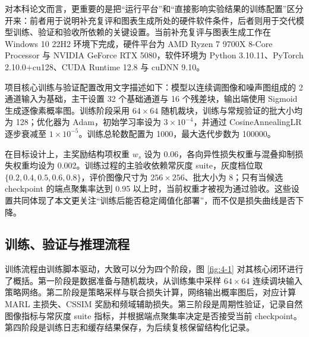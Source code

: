 \documentclass[thesis]{../zstucs-graduation-project}
\begin{document}
对本科论文而言，更重要的是把“运行平台”和“直接影响实验结果的训练配置”区分开来：前者用于说明补充复评和图表生成所处的硬件软件条件，后者则用于交代模型训练、验证和验收所依赖的关键设置。当前补充复评与图表生成工作在 Windows 10 22H2 环境下完成，硬件平台为 AMD Ryzen 7 9700X 8-Core Processor 与 NVIDIA GeForce RTX 5080，软件环境为 Python 3.10.11、PyTorch 2.10.0+cu128、CUDA Runtime 12.8 与 cuDNN 9.10。

项目核心训练与验证配置改用文字描述如下：模型以连续调图像和噪声图组成的 2 通道输入为基础，主干设置 32 个基础通道与 16 个残差块，输出端使用 Sigmoid 生成逐像素概率图。训练阶段采用 $64\times64$ 随机裁块，训练与常规验证的批大小均为 128；优化器为 Adam，初始学习率设为 $3\times10^{-4}$，并通过 CosineAnnealingLR 逐步衰减至 $1\times10^{-5}$。训练总轮数配置为 1000，最大迭代步数为 100000。

在目标设计上，主奖励结构项权重 $w_s$ 设为 0.06，各向异性损失权重与混叠抑制损失权重均设为 0.002。训练过程的主验收依赖常灰度 suite，灰度档位取 $\{0.2,0.4,0.5,0.6,0.8\}$，评价图像尺寸为 $256\times256$、批大小为 8；只有当候选 checkpoint 的端点聚集率达到 0.95 以上时，当前权重才被视为通过验收。这些设置共同体现了本文更关注“训练后能否稳定阈值化部署”，而不仅是损失曲线是否下降。

\subsection{训练、验证与推理流程}
训练流程由训练脚本驱动，大致可以分为四个阶段，图 \ref{fig:4-1} 对其核心闭环进行了概括。第一阶段是数据准备与随机裁块，从训练集中采样 $64\times64$ 连续调块输入策略网络。第二阶段是策略采样与联合损失计算，网络输出概率图后，对应计算 MARL 主损失、CSSIM 奖励和频域辅助损失。第三阶段是周期性验证，记录自然图像指标与常灰度 suite 指标，并根据端点聚集率决定是否接受当前 checkpoint。第四阶段是训练日志和缓存结果保存，为后续复核保留结构化记录。
\end{document}
